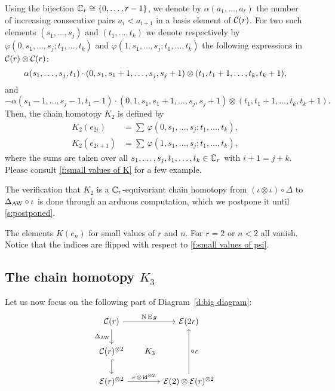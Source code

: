 Using the bijection $\mathbb{C}_r \cong \{0,\dots,r-1\}$, we denote by $\alpha(a_1,\dots,a_\ell)$ the number of increasing consecutive pairs $a_i < a_{i+1}$ in a basis element of $\mathcal{C}(r)$.
For two such elements $(s_1,\dots,s_j)$ and $(t_1,\dots,t_k)$ we denote respectively by $\varphi(0,s_1,\dots,s_j;t_1,\dots,t_k)$ and $\varphi(1,s_1,\dots,s_j;t_1,\dots,t_k)$ the following expressions in $\mathcal{C}(r) \otimes \mathcal{C}(r)$:
\[
\alpha(s_1,\dots,s_j,t_1) \cdot
(0,s_1,s_1+1,\dots,s_j,s_j+1) \otimes
(t_1,t_1+1,\dots,t_k,t_k+1),
\]
and
\[
- \alpha(s_1-1,\dots,s_j-1,t_1-1) \cdot
(0,1,s_1,s_1+1,\dots,s_j,s_j+1)\otimes (t_1,t_1+1,\dots,t_k,t_k+1).
\]
Then, the chain homotopy $K_2$ is defined by
\[
\begin{split}
	K_2(e_{2i})   &= \sum \, \varphi(0,s_1,\dots,s_j;t_1,\dots,t_k), \\
	K_2(e_{2i+1}) &= \sum \, \varphi(1,s_1,\dots,s_j;t_1,\dots,t_k),
\end{split}
\]
where the sums are taken over all $s_1,\dots,s_j,t_1,\dots,t_k \in \mathbb{C}_r$ with $i+1 = j+k$.
Please consult \cref{f:small values of K} for a few example.

The verification that $K_2$ is a $\mathbb{C}_r$-equivariant chain homotopy from $(\iota\otimes \iota)\circ \Delta$ to $\Delta_{\operatorname{AW}}\circ \iota$ is done through an arduous computation, which we postpone it until \cref{s:postponed}.

\begin{table}
	\centering
	
	\caption{The elements $K(e_n)$ for small values of $r$ and $n$. For $r=2$ or $n<2$ all vanish. Notice that the indices are flipped with respect to \cref{f:small values of psi}.}
	\label{f:small values of K}
\end{table}

\subsection{The chain homotopy $K_3$}

Let us now focus on the following part of Diagram~\eqref{d:big diagram}:
\[
\begin{tikzcd}
	\cC(r)
	\arrow[r,"\chains\EE g"]
	\arrow[d,"\Delta_{\AW}"']
	\arrow[ddr,phantom,"K_3",shift left=0pt]
	&[15pt] \BE(2r)
	\\
	\cC(r)^{\ot 2}
	\arrow[d,hook] & \\
	\BE(r)^{\ot 2}
	\arrow[r,"e\, \ot\, \id^{\ot 2}"]
	& \BE(2) \ot \BE(r)^{\ot 2}
	\arrow[uu,"\bcirc_\BE"']
\end{tikzcd}
\]

